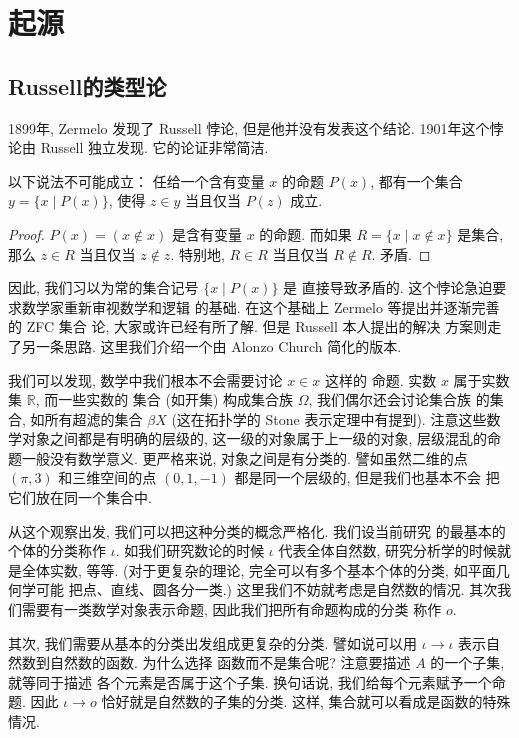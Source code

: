 \chapter{起源}
\section{Russell的类型论} %
1899年, Zermelo 发现了 Russell 悖论,
但是他并没有发表这个结论.
1901年这个悖论由 Russell 独立发现.
它的论证非常简洁.
\begin{theorem}[Russell]
以下说法不可能成立： 任给一个含有变量 \(x\) 的命题 \(P(x)\),
都有一个集合 \(y = \{x \mid P(x)\}\), 使得
\(z \in y\) 当且仅当 \(P(z)\) 成立.
\end{theorem}
\begin{proof}
\(P(x) = (x \notin x)\) 是含有变量 \(x\) 的命题.
而如果 \(R = \{x \mid x \notin x\}\) 是集合,
那么 \(z \in R\) 当且仅当 \(z \notin z\).
特别地, \(R \in R\) 当且仅当 \(R \notin R\).
矛盾.
\end{proof}
因此, 我们习以为常的集合记号 \(\{x \mid P(x)\}\) 是
直接导致矛盾的. 这个悖论急迫要求数学家重新审视数学和逻辑
的基础. 在这个基础上 Zermelo 等提出并逐渐完善的 ZFC 集合
论, 大家或许已经有所了解. 但是 Russell 本人提出的解决
方案则走了另一条思路. 这里我们介绍一个由 Alonzo Church 简化的版本.%
~\cite{sep:2022:typetheory}

我们可以发现, 数学中我们根本不会需要讨论 \(x \in x\) 这样的
命题. 实数 \(x\) 属于实数集 \(\mathbb R\), 而一些实数的
集合 (如开集) 构成集合族 \(\Omega\), 我们偶尔还会讨论集合族
的集合, 如所有超滤的集合 \(\beta X\) (这在拓扑学的
Stone 表示定理中有提到). 注意这些数学对象之间都是有明确的层级的,
这一级的对象属于上一级的对象, 层级混乱的命题一般没有数学意义.
更严格来说, 对象之间是有分类的. 譬如虽然二维的点 \((\pi, 3)\)
和三维空间的点 \((0,1,-1)\) 都是同一个层级的, 但是我们也基本不会
把它们放在同一个集合中.

从这个观察出发, 我们可以把这种分类的概念严格化. 我们设当前研究
的最基本的个体的分类称作 \(\iota\). 如我们研究数论的时候
\(\iota\) 代表全体自然数, 研究分析学的时候就是全体实数, 等等.
(对于更复杂的理论, 完全可以有多个基本个体的分类, 如平面几何学可能
把点、直线、圆各分一类.) 这里我们不妨就考虑是自然数的情况.
其次我们需要有一类数学对象表示命题, 因此我们把所有命题构成的分类
称作 \(o\).

其次, 我们需要从基本的分类出发组成更复杂的分类. 譬如说可以用
\(\iota \to \iota\) 表示自然数到自然数的函数. 为什么选择
函数而不是集合呢? 注意要描述 \(A\) 的一个子集, 就等同于描述
各个元素是否属于这个子集. 换句话说, 我们给每个元素赋予一个命题.
因此 \(\iota \to o\) 恰好就是自然数的子集的分类. 这样,
集合就可以看成是函数的特殊情况.

